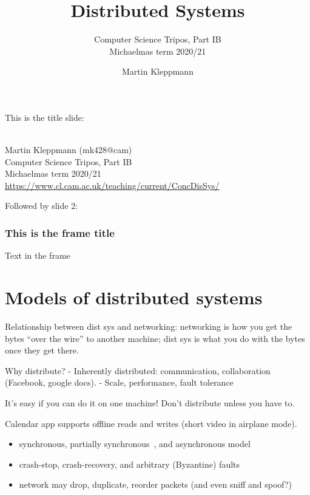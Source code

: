 
\title{Distributed Systems}
\subtitle{Computer Science Tripos, Part IB\\Michaelmas term 2020/21}
\author{Martin Kleppmann}
\date{}
\maketitle

This is the title slide:

\begin{frame}
    \label{s:title}
    \begin{center}
        \textbf{\huge{\color{darkblue}{Distributed Systems}}} \\[2em]
        Martin Kleppmann (mk428@cam) \\[2em]
        Computer Science Tripos, Part IB \\[0.5em]
        Michaelmas term 2020/21 \\[0.5em]
        \url{https://www.cl.cam.ac.uk/teaching/current/ConcDisSys/}
    \end{center}
\end{frame}

Followed by slide 2:

\begin{frame}
    \label{s:test}
    \frametitle{This is the frame title}
    Text in the frame
\end{frame}

\section{Models of distributed systems}

Relationship between dist sys and networking: networking is how you get the bytes ``over the wire'' to another machine; dist sys is what you do with the bytes once they get there.

Why distribute?
- Inherently distributed: communication, collaboration (Facebook, google docs).
- Scale, performance, fault tolerance

It's easy if you can do it on one machine! Don't distribute unless you have to. 

Calendar app supports offline reads and writes (short video in airplane mode).

\begin{itemize}
\item synchronous, partially synchronous~\cite{Dwork:1988dr}, and asynchronous model
\item crash-stop, crash-recovery, and arbitrary (Byzantine) faults
\item network may drop, duplicate, reorder packets (and even sniff and spoof?)
\end{itemize}

